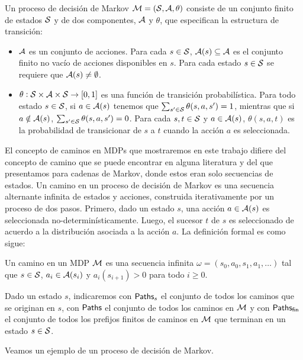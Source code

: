 \begin{definition}
	Un proceso de decisión de Markov $\mathcal{M} =(\mathcal{S}, \mathcal{A}, \theta)$ consiste de un conjunto finito de estados $\mathcal{S}$ y de dos componentes, $\mathcal{A}$ y $\theta$, que especifican la estructura de transición:
	\begin{itemize}
		\item $\mathcal{A}$ es un conjunto de acciones. Para cada $s \in \mathcal{S}$, $\mathcal{A}(s) \subseteq \mathcal{A}$ es el conjunto finito no vacío de
		      acciones disponibles en $s$. Para cada estado $s \in \mathcal{S}$ se requiere que $\mathcal{A}(s) \neq \emptyset$.
		\item $\theta : \mathcal{S} \times \mathcal{A} \times \mathcal{S} \rightarrow [0,1]$ es una función de transición probabilística. Para todo estado $s \in \mathcal{S}$, si $a \in \mathcal{A}(s)$ tenemos que $\sum_{s' \in \mathcal{S}} \theta(s, a, s') = 1$, mientras que si $a \notin \mathcal{A}(s)$, $\sum_{s' \in \mathcal{S}} \theta(s, a, s') = 0$. Para cada $s, t \in \mathcal{S}$ y $a \in \mathcal{A}(s)$, $\theta(s, a, t)$ es la probabilidad de transicionar de $s$ a $t$ cuando la acción $a$ es seleccionada.
	\end{itemize}
\end{definition}

El concepto de caminos en MDPs que mostraremos en este trabajo difiere del
concepto de camino que se puede encontrar en alguna literatura y del que
presentamos para cadenas de Markov, donde estos eran solo secuencias de
estados. Un camino en un proceso de decisión de Markov es una secuencia
alternante infinita de estados y acciones, construida iterativamente por un
proceso de dos pasos. Primero, dado un estado $s$, una acción $a \in \mathcal{A}(s)$
es seleccionada no-determinísticamente. Luego, el sucesor $t$ de $s$ es
seleccionado de acuerdo a la distribución asociada a la acción $a$. La
definición formal es como sigue:

\begin{definition}
	Un camino en un MDP $\mathcal{M}$ es una secuencia infinita $\omega = (s_0, a_0, s_1, a_1, \dots)$ tal que $s \in \mathcal{S}$, $a_i \in \mathcal{A}(s_i)$ y $a_i(s_{i+1}) > 0$ para todo $i \geq 0$.

	Dado un estado $s$, indicaremos con $\textsf{Paths}_s$ el conjunto de todos los caminos
	que se originan en $s$, con $\textsf{Paths}$ el conjunto de todos los caminos en $\mathcal{M}$ y
	con $\textsf{Paths}_\textsf{fin}$ el conjunto de todos los prefijos finitos de caminos en $\mathcal{M}$
	que terminan en un estado $s \in \mathcal{S}$.
\end{definition}

Veamos un ejemplo de un proceso de decisión de Markov.

